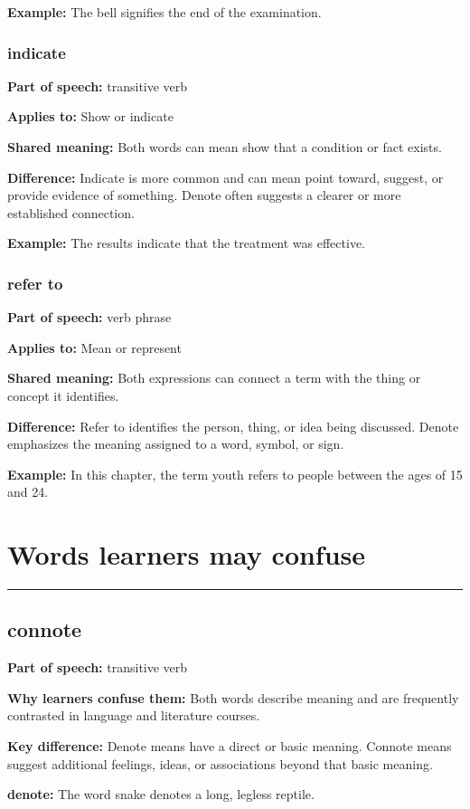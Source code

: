 \documentclass[11pt]{article}
\newcommand{\sectionrule}{\par\vspace{-0.5em}\noindent\textcolor{Accent}{\rule{\linewidth}{0.6pt}}\par}
\begin{document}
\textbf{Example:} The bell signifies the end of the examination.

\subsubsection{indicate}
\textbf{Part of speech:} transitive verb

\textbf{Applies to:} Show or indicate

\textbf{Shared meaning:} Both words can mean show that a condition or fact exists.

\textbf{Difference:} Indicate is more common and can mean point toward, suggest, or provide evidence of something. Denote often suggests a clearer or more established connection.

\textbf{Example:} The results indicate that the treatment was effective.

\subsubsection{refer to}
\textbf{Part of speech:} verb phrase

\textbf{Applies to:} Mean or represent

\textbf{Shared meaning:} Both expressions can connect a term with the thing or concept it identifies.

\textbf{Difference:} Refer to identifies the person, thing, or idea being discussed. Denote emphasizes the meaning assigned to a word, symbol, or sign.

\textbf{Example:} In this chapter, the term youth refers to people between the ages of 15 and 24.

\section{Words learners may confuse}
\sectionrule
\subsection{connote}
\textbf{Part of speech:} transitive verb

\textbf{Why learners confuse them:} Both words describe meaning and are frequently contrasted in language and literature courses.

\textbf{Key difference:} Denote means have a direct or basic meaning. Connote means suggest additional feelings, ideas, or associations beyond that basic meaning.

\textbf{denote:} The word snake denotes a long, legless reptile.
\end{document}
